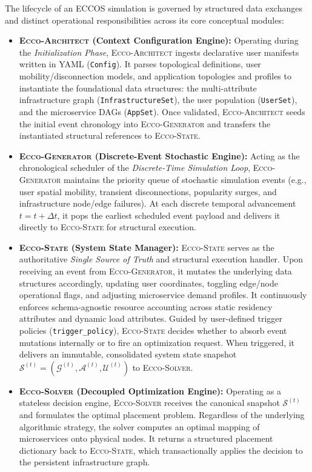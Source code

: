 \documentclass[ASNA]{USG} %
\begin{document}
The lifecycle of an ECCOS simulation is governed by structured data exchanges and distinct operational responsibilities across its core conceptual modules:
\begin{itemize}
    \item \textbf{\textsc{Ecco-Architect} (Context Configuration Engine):}
    Operating during the \emph{Initialization Phase}, \textsc{Ecco-Architect} ingests declarative user manifests written in YAML (\texttt{Config}). It parses topological definitions, user mobility/disconnection models, and application topologies and profiles to instantiate the foundational data structures: the multi-attribute infrastructure graph (\texttt{InfrastructureSet}), the user population (\texttt{UserSet}), and the microservice DAGs (\texttt{AppSet}). Once validated, \textsc{Ecco-Architect} seeds the initial event chronology into \textsc{Ecco-Generator} and transfers the instantiated structural references to \textsc{Ecco-State}.
    \item \textbf{\textsc{Ecco-Generator} (Discrete-Event Stochastic Engine):}
    Acting as the chronological scheduler of the \emph{Discrete-Time Simulation Loop}, \textsc{Ecco-Generator} maintains the priority queue of stochastic simulation events (e.g., user spatial mobility, transient disconnections, popularity surges, and infrastructure node/edge failures). At each discrete temporal advancement $t = t + \Delta t$, it pops the earliest scheduled event payload and delivers it directly to \textsc{Ecco-State} for structural execution.
    \item \textbf{\textsc{Ecco-State} (System State Manager):}
    \textsc{Ecco-State} serves as the authoritative \emph{Single Source of Truth} and structural execution handler. Upon receiving an event from \textsc{Ecco-Generator}, it mutates the underlying data structures accordingly, updating user coordinates, toggling edge/node operational flags, and adjusting microservice demand profiles. It continuously enforces schema-agnostic resource accounting across static residency attributes and dynamic load attributes. Guided by user-defined trigger policies (\texttt{trigger\_policy}), \textsc{Ecco-State} decides whether to absorb event mutations internally or to fire an optimization request. When triggered, it delivers an immutable, consolidated system state snapshot $\mathcal{S}^{(t)} = (\mathcal{G}^{(t)},\mathcal{A}^{(t)},\mathcal{U}^{(t)})$ to \textsc{Ecco-Solver}.
    \item \textbf{\textsc{Ecco-Solver} (Decoupled Optimization Engine):}
    Operating as a stateless decision engine, \textsc{Ecco-Solver} receives the canonical snapshot $\mathcal{S}^{(t)}$ and formulates the optimal placement problem. Regardless of the underlying algorithmic strategy, the solver computes an optimal mapping of microservices onto physical nodes. It returns a structured placement dictionary back to \textsc{Ecco-State}, which transactionally applies the decision to the persistent infrastructure graph.

\end{itemize}
\end{document}
